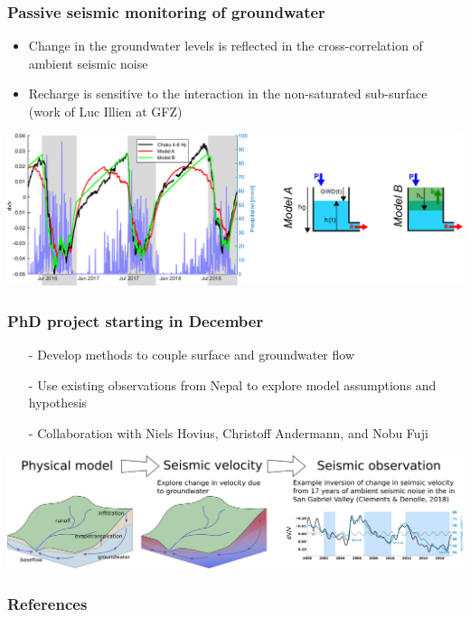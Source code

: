 \documentclass[aspectratio=169]{beamer}
\begin{document}
\begin{frame}
    \frametitle{Passive seismic monitoring of groundwater}
    \begin{itemize}
        \item{Change in the groundwater levels is reflected in the cross-correlation of ambient seismic noise}
        \item{Recharge is sensitive to the interaction in the non-saturated sub-surface (work of Luc Illien at GFZ)}
    \end{itemize}
    \centering
    \includegraphics[height=0.5\paperheight]{./figures/illien-figure.png}
\end{frame}

\begin{frame}
    \frametitle{PhD project starting in December}
    \begin{itemize}
        \item[-]{Develop methods to couple surface and groundwater flow}
        \item[-]{Use existing observations from Nepal to explore model assumptions and hypothesis}
        \item[-]{Collaboration with Niels Hovius, Christoff Andermann, and Nobu Fuji}
    \end{itemize}
    \includegraphics[width=0.9\paperwidth]{./figures/groundwater.svg.png}
\end{frame}

\begin{frame}
    \frametitle{References}
    {\tiny
    
    
    }
\end{frame}
\end{document}
